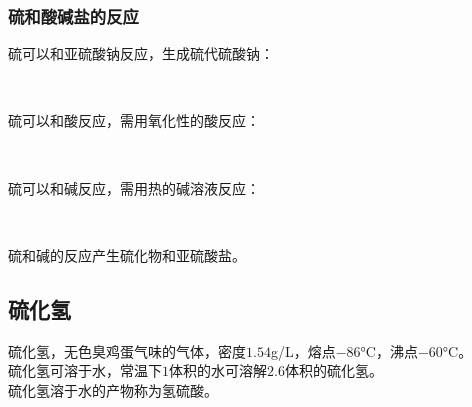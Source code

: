 \documentclass[UTF8]{ctexart}
\begin{document}
\newpage

\subsubsection{硫和酸碱盐的反应}
    硫可以和亚硫酸钠反应，生成硫代硫酸钠：
    \begin{center}
        \\[4mm]
    \end{center}
    硫可以和酸反应，需用氧化性的酸反应：
    \begin{center}
        \\[4mm]
    \end{center}
    硫可以和碱反应，需用热的碱溶液反应：
    \begin{center}
        \\[4mm]
    \end{center}
    硫和碱的反应产生硫化物和亚硫酸盐。

\subsection{硫化氢}
    硫化氢，无色臭鸡蛋气味的气体，密度$1.54$\si{g/L}，熔点$-86$\si{\degreeCelsius}，沸点$-60$\si{\degreeCelsius}。\\[3mm]
    硫化氢可溶于水，常温下$1$体积的水可溶解$2.6$体积的硫化氢。\\[3mm]
    硫化氢溶于水的产物称为氢硫酸。
\end{document}
